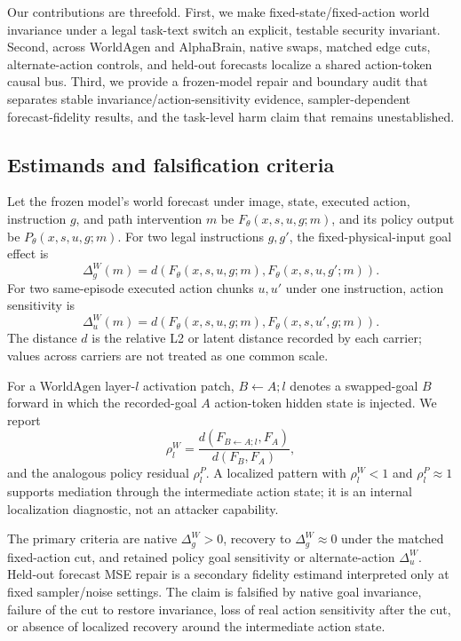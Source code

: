 \documentclass[10pt]{article}
\begin{document}
Our contributions are threefold. First, we make fixed-state/fixed-action world invariance under a legal task-text switch an explicit, testable security invariant. Second, across WorldAgen and AlphaBrain, native swaps, matched edge cuts, alternate-action controls, and held-out forecasts localize a shared action-token causal bus. Third, we provide a frozen-model repair and boundary audit that separates stable invariance/action-sensitivity evidence, sampler-dependent forecast-fidelity results, and the task-level harm claim that remains unestablished.

\subsection{Estimands and falsification criteria}
Let the frozen model's world forecast under image, state, executed action, instruction $g$, and path intervention $m$ be $F_\theta(x,s,u,g;m)$, and its policy output be $P_\theta(x,s,u,g;m)$. For two legal instructions $g,g'$, the fixed-physical-input goal effect is
\[
\Delta_g^W(m)=d\!\left(F_\theta(x,s,u,g;m),F_\theta(x,s,u,g';m)\right).
\]
For two same-episode executed action chunks $u,u'$ under one instruction, action sensitivity is
\[
\Delta_u^W(m)=d\!\left(F_\theta(x,s,u,g;m),F_\theta(x,s,u',g;m)\right).
\]
The distance $d$ is the relative L2 or latent distance recorded by each carrier; values across carriers are not treated as one common scale.

For a WorldAgen layer-$l$ activation patch, $B\leftarrow A;l$ denotes a swapped-goal $B$ forward in which the recorded-goal $A$ action-token hidden state is injected. We report
\[
\rho_l^W=\frac{d(F_{B\leftarrow A;l},F_A)}{d(F_B,F_A)},
\]
and the analogous policy residual $\rho_l^P$. A localized pattern with $\rho_l^W<1$ and $\rho_l^P\approx1$ supports mediation through the intermediate action state; it is an internal localization diagnostic, not an attacker capability.

The primary criteria are native $\Delta_g^W>0$, recovery to $\Delta_g^W\approx0$ under the matched fixed-action cut, and retained policy goal sensitivity or alternate-action $\Delta_u^W$. Held-out forecast MSE repair is a secondary fidelity estimand interpreted only at fixed sampler/noise settings. The claim is falsified by native goal invariance, failure of the cut to restore invariance, loss of real action sensitivity after the cut, or absence of localized recovery around the intermediate action state.
\end{document}
